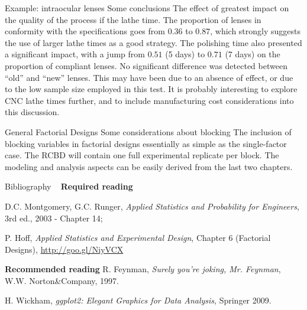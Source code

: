\documentclass[t]{beamer}
\begin{document}

\begin{ftst}
{Example: intraocular lenses}
{Some conclusions}
The effect of greatest impact on the quality of the process if the lathe time. The proportion of lenses in conformity with the specifications goes from $0.36$ to $0.87$, which strongly suggests the use of larger lathe times as a good strategy.
\vone
The polishing time  also presented a significant impact, with a jump from $0.51$ (5 days) to $0.71$ (7 days) on the proportion of compliant lenses.
\vone
No significant difference was detected between ``old'' and ``new'' lenses. This may have been due to an absence of effect, or due to the low sample size employed in this test. 
\vone
It is probably interesting to explore CNC lathe times further, and to include manufacturing cost considerations into this discussion.
\end{ftst}


\begin{ftst}
{General Factorial Designs}
{Some considerations about blocking}
The inclusion of blocking variables in factorial designs essentially as simple as the single-factor case.
\vone
The RCBD will contain one full experimental replicate per block. The modeling and analysis aspects can be easily derived from the last two chapters.
\vone

\end{ftst}

\begin{ftst}
{Bibliography}
{\ }
\scriptsize
\textbf{Required reading}

\benums D.C. Montgomery, G.C. Runger, \textit{Applied Statistics and Probability for Engineers}, 3rd ed., 2003 - Chapter 14;
\item P. Hoff, \textit{Applied Statistics and Experimental Design}, Chapter 6 (Factorial Designs), \url{http://goo.gl/NiyVCX} 
\eenum

\textbf{Recommended reading}
\benums R. Feynman, \textit{Surely you're joking, Mr. Feynman}, W.W. Norton\&Company, 1997.
\item H. Wickham, \textit{ggplot2: Elegant Graphics for Data Analysis}, Springer 2009.
\eenum
\end{ftst}

\end{document}
